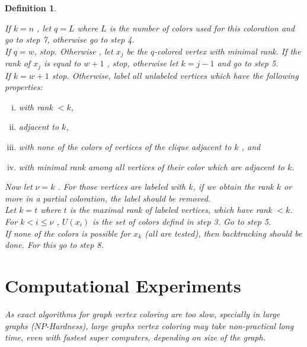 \documentclass[12pt]{article}
\theoremstyle{slplain}
\newtheorem{defi}{Definition}
\begin{document}
\begin{defi}
\begin{algorithm}[H]
{ If $k = n$ , let $q = L$ where $L$ is the number of colors used for this coloration
and go to step 7, otherwise go to step 4.\\

 If $q = w$, stop. Otherwise , let $x_j$ be the $q$-colored vertex with minimal
rank. If the rank of $x_j$ is equal to $w + 1$ , stop, otherwise let $k = j - 1$ and
go to step 5.\\

 If $k = w + 1$ stop. Otherwise, label all unlabeled vertices which have the
following properties:
\begin{enumerate}[(i)]
\item with rank $< k$,

\item adjacent to $k$,

\item with none of the colors of vertices of the clique adjacent to $k$ , and
\item with minimal rank among all vertices of their color which are adjacent
to $k$.
\end{enumerate}\newline
Now let $\nu = k$ . For those vertices are labeled with $k$, if we obtain the rank
$k$ or more in a partial coloration, the label should be removed.\\


\nl Let $k = t$ where $t$ is the maximal rank of labeled vertices, which have rank $< k$. For $k < i \leq \nu$ , $U(x_i)$ is the set of colors defind in step 3. Go to step 5.\\


\nl If none of the colors is possible for $x_k$ (all are tested), then backtracking
should be done. For this go to step 8.\\}
\end{algorithm}
\restoregeometry

\newpage


\section{Computational Experiments}\label{exp}

As exact algorithms for graph vertex coloring are too slow, specially in large 
graphs ($NP$-Hardness), large graphs vertex coloring 
may take non-practical long time, even with fastest super computers, depending on size of the graph. 


\end{defi}
\end{document}
